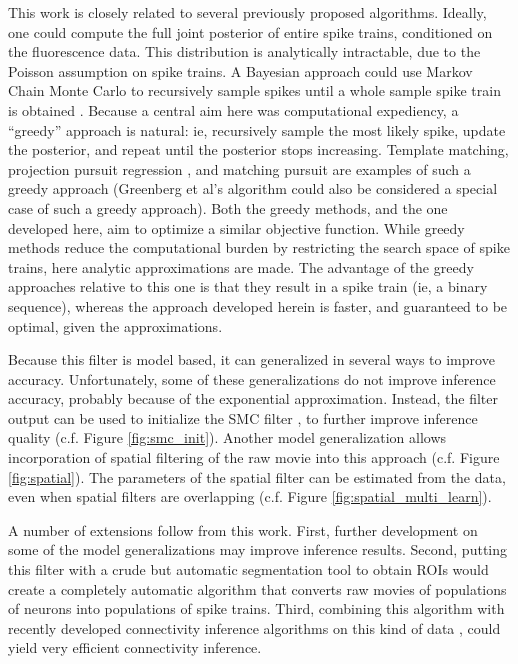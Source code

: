 This work is closely related to several previously proposed algorithms.  Ideally, one could compute the full joint posterior of entire spike trains, conditioned on the fluorescence data.  This distribution is analytically intractable, due to the Poisson assumption on spike trains.  A Bayesian approach could use Markov Chain Monte Carlo to recursively sample spikes until a whole sample spike train is obtained \cite{AndrieuDoucet01}.  Because a central aim here was computational expediency, a ``greedy'' approach is natural: ie, recursively sample the most likely spike, update the posterior, and repeat until the posterior stops increasing.  Template matching, projection pursuit regression \cite{FS81}, and matching pursuit \cite{MallatZhang93} are examples of such a greedy approach (Greenberg et al's algorithm could also be considered a special case of such a greedy approach).  Both the greedy methods, and the one developed here, aim to optimize a similar objective function.  While greedy methods reduce the computational burden by restricting the search space of spike trains, here analytic approximations are made.  The advantage of the greedy approaches relative to this one is that they result in a spike train (ie, a binary sequence), whereas the approach developed herein is faster, and guaranteed to be optimal, given the approximations.  


Because this filter is model based, it can generalized in several ways to improve accuracy.  Unfortunately, some of these generalizations do not improve inference accuracy, probably because of the exponential approximation.  Instead, the \foopsi filter output can be used to initialize the SMC filter \cite{VogelsteinPaninski09}, to further improve inference quality (c.f. Figure \ref{fig:smc_init}).  Another model generalization allows incorporation of spatial filtering of the raw movie into this approach (c.f. Figure \ref{fig:spatial}).  The parameters of the spatial filter can be estimated from the data, even when spatial filters are overlapping (c.f. Figure \ref{fig:spatial_multi_learn}).

A number of extensions follow from this work.  First, further development on some of the model generalizations may improve inference results. Second, putting this filter with a crude but automatic segmentation tool to obtain ROIs would create a completely automatic algorithm that converts raw movies of populations of neurons into populations of spike trains.  Third, combining this algorithm with recently developed connectivity inference algorithms on this kind of data \cite{MishchenkoPaninski09}, could yield very efficient connectivity inference.
